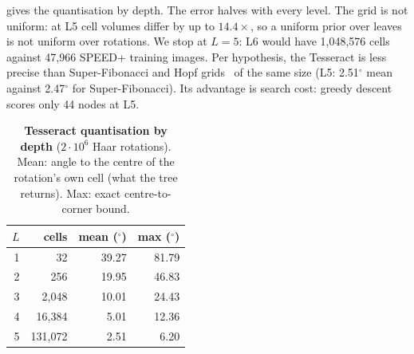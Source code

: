  gives the quantisation by depth. The error halves with every level. The grid is not uniform: at L5 cell volumes differ by up to $14.4\times$, so a uniform prior over leaves is not uniform over rotations. We stop at $L=5$: L6 would have 1,048,576 cells against 47,966 SPEED+ training images. Per hypothesis, the Tesseract is less precise than Super-Fibonacci and Hopf grids~\cite{yershova2010hopf} of the same size (L5: 2.51$^\circ$ mean against 2.47$^\circ$ for Super-Fibonacci). Its advantage is search cost: greedy descent scores only 44 nodes at L5.

\begin{table}[t]
  \centering\footnotesize
  \caption{\textbf{Tesseract quantisation by depth} ($2\cdot10^6$ Haar rotations). Mean: angle to the centre of the rotation's own cell (what the tree returns). Max: exact centre-to-corner bound.}
  \label{app:z_tab_depth}
  \begin{tabular}{@{}rrrr@{}}
    \toprule
    $L$ & cells & mean ($^\circ$) & max ($^\circ$)\\
    \midrule
    1 & 32 & 39.27 & 81.79\\
    2 & 256 & 19.95 & 46.83\\
    3 & 2,048 & 10.01 & 24.43\\
    4 & 16,384 & 5.01 & 12.36\\
    5 & 131,072 & 2.51 & 6.20\\
    \bottomrule
  \end{tabular}
\end{table}

